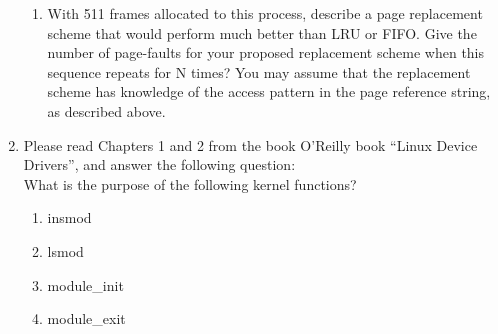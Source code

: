 \documentclass[11pt]{article}
\begin{document}
\begin{enumerate}
\begin{enumerate}
      \item With 511 frames allocated to this process, describe a page replacement scheme that would perform much better than LRU or FIFO.  Give the number of page-faults for your proposed replacement scheme when this sequence repeats for N times?  You may assume that the replacement scheme has knowledge of the access pattern in the page reference string, as described above.
    \end{enumerate}

  \newpage
  \item Please read Chapters 1 and 2 from the book O’Reilly book ``Linux Device Drivers'', and answer the following question: \\
    What is the purpose of the following kernel functions?
    \begin{enumerate}
      \item insmod
      \item lsmod
      \item module\_init
      \item module\_exit
    \end{enumerate}
\end{enumerate}
\end{document}
